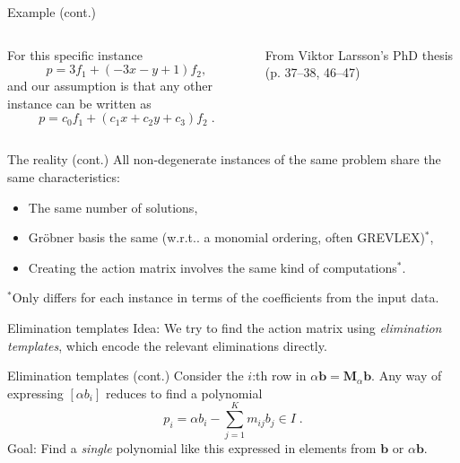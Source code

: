 \documentclass[aspectratio=169]{beamer}
\makeatletter
\newcommand{\mat}[1]{\bm{#1}}
\DeclareRobustCommand\wrt{w.r.t\@ifnextchar.{}{.\@}}
\makeatother
\begin{document}
\begin{frame}[t]{Example (cont.)}
\vspace{1cm}
\begin{columns}
    \begin{column}{0.7\textwidth}
        For this specific instance
        \begin{equation*}
            p = 3f_1 + (-3x-y+1)f_2,
        \end{equation*}
        and our assumption is that any other instance can be written as
        \begin{equation*}
            p = c_0f_1 + (c_1x+c_2y+c_3)f_2\;.
        \end{equation*}
    \end{column}%
    \begin{column}{0.3\textwidth}
        \centering
        

        \vspace{5mm}

        {\scriptsize From Viktor Larsson's PhD thesis (p. 37--38, 46--47)}
    \end{column}
\end{columns}
\end{frame}

\begin{frame}{The reality (cont.)}
All non-degenerate instances of the same problem share the same characteristics:
\begin{itemize}
\item The same number of solutions,
\item Gröbner basis the same (\wrt{} a monomial ordering, often GREVLEX)${}^*$,
\item Creating the action matrix involves the same kind of computations${}^*$.
\end{itemize}
${}^*$Only differs for each instance in terms of the coefficients from the input data.
\end{frame}

\begin{frame}{Elimination templates}
\alert{Idea:} We try to find the action matrix using \emph{elimination templates},
which encode the relevant eliminations directly.
\end{frame}

\begin{frame}{Elimination templates (cont.)}
Consider the $i$:th row in $\alpha\mat{b} = \mat{M}_\alpha\mat{b}$.
Any way of expressing $[\alpha b_i]$ reduces to find a polynomial
\begin{equation*}
    p_i = \alpha b_i -\sum_{j=1}^Km_{ij}b_{j}\in I\;.
\end{equation*}
\alert{Goal:} Find a \emph{single} polynomial like this expressed in elements from
$\mat{b}$ or $\alpha\mat{b}$.
\end{frame}
\end{document}
